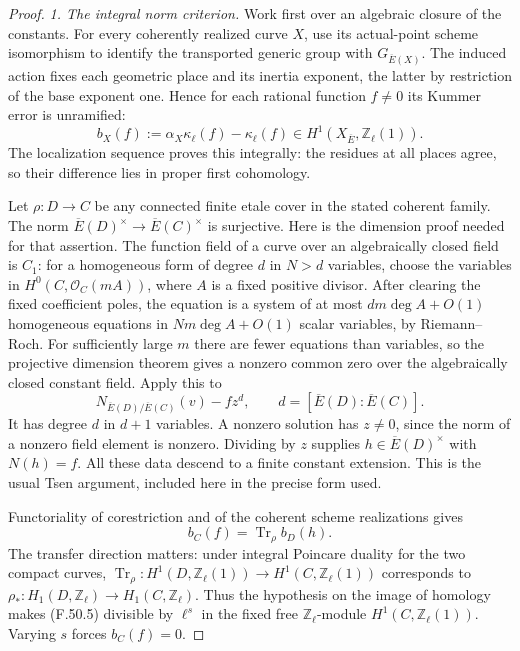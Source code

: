 \documentclass[11pt]{article}
\begin{document}
\begin{proof}
\emph{1. The integral norm criterion.}
Work first over an algebraic closure of the constants.
For every coherently realized curve \(X\), use its
actual-point scheme isomorphism to identify the
transported generic group with \(G_{\overline E(X)}\).
The induced action fixes each geometric place and its
inertia exponent, the latter by restriction of the
base exponent one. Hence for each rational function
\(f\ne0\) its Kummer error is unramified:
\[
 b_X(f):=\alpha_X\kappa_\ell(f)-\kappa_\ell(f)
             \in H^1(X_{\overline E},\mathbb Z_\ell(1)).
                                                        \tag{F.50.3}
\]
The localization sequence proves this integrally:
the residues at all places agree, so their difference
lies in proper first cohomology.

Let \(\rho:D\to C\) be any connected finite etale
cover in the stated coherent family. The norm
\(\overline E(D)^\times\to\overline E(C)^\times\)
is surjective. Here is the dimension proof needed for
that assertion. The function field of a curve over an
algebraically closed field is \(C_1\): for a
homogeneous form of degree \(d\) in \(N>d\) variables,
choose the variables in \(H^0(C,\mathcal O_C(mA))\),
where \(A\) is a fixed positive divisor. After clearing
the fixed coefficient poles, the equation is a system
of at most \(dm\deg A+O(1)\) homogeneous equations in
\(Nm\deg A+O(1)\) scalar variables, by Riemann--Roch.
For sufficiently large \(m\) there are fewer equations
than variables, so the projective dimension theorem
gives a nonzero common zero over the algebraically
closed constant field. Apply this to
\[
               N_{\overline E(D)/\overline E(C)}(v)-f z^d,
               \qquad d=[\overline E(D):\overline E(C)].
                                                        \tag{F.50.4}
\]
It has degree \(d\) in \(d+1\) variables. A nonzero
solution has \(z\ne0\), since the norm of a nonzero
field element is nonzero. Dividing by \(z\) supplies
\(h\in\overline E(D)^\times\) with \(N(h)=f\).
All these data descend to a finite constant extension.
This is the usual Tsen argument, included here in the
precise form used.

Functoriality of corestriction and of the coherent
scheme realizations gives
\[
                   b_C(f)=\operatorname{Tr}_\rho b_D(h).
                                                        \tag{F.50.5}
\]
The transfer direction matters: under integral
Poincare duality for the two compact curves,
\(\operatorname{Tr}_\rho:H^1(D,\mathbb Z_\ell(1))
\to H^1(C,\mathbb Z_\ell(1))\) corresponds to
\(\rho_*:H_1(D,\mathbb Z_\ell)\to
H_1(C,\mathbb Z_\ell)\). Thus the hypothesis on
the image of homology makes (F.50.5) divisible by
\(\ell^s\) in the fixed free \(\mathbb Z_\ell\)-module
\(H^1(C,\mathbb Z_\ell(1))\). Varying \(s\) forces
\(b_C(f)=0\).


\end{proof}
\end{document}
